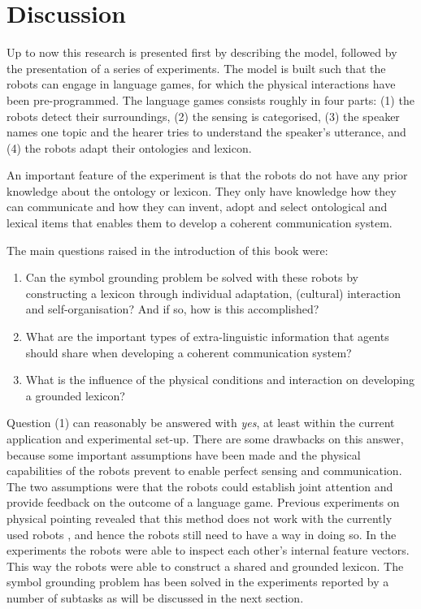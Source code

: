\chapter{Discussion}\label{ch:disc}

Up to now this research is presented first by describing the model, followed by the presentation of a series of experiments. The model is built such that the robots can engage in language games, for which the physical interactions have been pre-programmed. The language games consists roughly in four parts: (1) the robots detect their surroundings, (2) the sensing is categorised, (3) the speaker names one topic and the hearer tries to understand the speaker's utterance, and (4) the robots adapt their ontologies and lexicon.

An important feature of the experiment is that the robots do not have any prior knowledge about the ontology or lexicon. They only have knowledge how they can communicate and how they can invent, adopt and select ontological and lexical items that enables them to develop a coherent communication system. 

The main questions raised in the introduction of this book were:

\begin{enumerate}
\item Can the symbol grounding problem be solved with these robots by constructing a lexicon through individual adaptation, (cultural) interaction and self-organisation? And if so, how is this accomplished?
\item What are the important types of extra-linguistic information that agents should share when developing a coherent communication system?
\item What is the influence of the physical conditions and interaction on developing a grounded lexicon?
\end{enumerate}

Question (1) can reasonably be answered with {\em yes}, at least within the current application and experimental set-up. There are some drawbacks on this answer, because some important assumptions have been made and the physical capabilities of the robots prevent to enable perfect sensing and communication. The two assumptions were that the robots could establish joint attention and provide feedback on the outcome of a language game. Previous experiments on physical pointing revealed that this method does not work with the currently used robots \citep{vogt:1998b}, and hence the robots still need to have a way in doing so. In the experiments the robots were able to inspect each other's internal feature vectors. This way the robots were able to construct a shared and grounded lexicon. The symbol grounding problem has been solved in the experiments reported by a number of subtasks as will be discussed in the next section.

